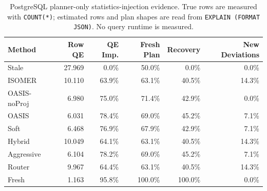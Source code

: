 \begin{table}[t]
  \centering
  \small
  \caption{PostgreSQL planner-only statistics-injection evidence. True rows are measured with \texttt{COUNT(*)}; estimated rows and plan shapes are read from \texttt{EXPLAIN (FORMAT JSON)}. No query runtime is measured.}
  \label{tab:postgres_planner_stats_injection}
  \setlength{\tabcolsep}{4pt}
  \begin{tabular}{lrrrrr}
    \toprule
    Method & Row QE & QE Imp. & Fresh Plan & Recovery & New Deviations \\
    \midrule
    Stale & 27.969 & 0.0\% & 50.0\% & 0.0\% & 0.0\% \\
    ISOMER & 10.110 & 63.9\% & 63.1\% & 40.5\% & 14.3\% \\
    OASIS-noProj & 6.980 & 75.0\% & 71.4\% & 42.9\% & 0.0\% \\
    OASIS & 6.031 & 78.4\% & 69.0\% & 45.2\% & 7.1\% \\
    Soft & 6.468 & 76.9\% & 67.9\% & 42.9\% & 7.1\% \\
    Hybrid & 10.049 & 64.1\% & 63.1\% & 40.5\% & 14.3\% \\
    Aggressive & 6.104 & 78.2\% & 69.0\% & 45.2\% & 7.1\% \\
    Router & 9.967 & 64.4\% & 63.1\% & 40.5\% & 14.3\% \\
    Fresh & 1.163 & 95.8\% & 100.0\% & 100.0\% & 0.0\% \\
    \bottomrule
  \end{tabular}
\end{table}
